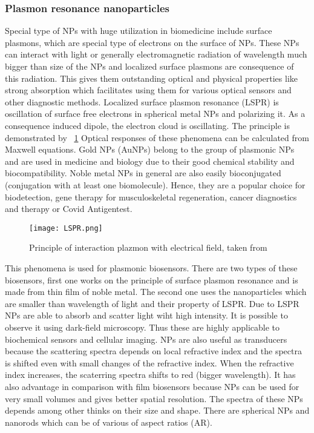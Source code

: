 \subsubsection{Plasmon resonance nanoparticles}

        Special type of NPs with huge utilization in biomedicine include surface plasmons, which are special type of electrons on the surface of NPs.
        These NPs can interact with light or generally electromagnetic radiation of wavelength much bigger than size of the NPs and localized surface
        plasmons are consequence of this radiation. This gives them outstanding optical and physical properties like strong absorption which facilitates
        using them for various optical sensors and other diagnostic methods. Localized surface plasmon resonance (LSPR) is oscillation of surface free
        electrons in spherical metal NPs and polarizing it. As a consequence induced dipole, the electron cloud is oscillating. The principle is demonstrated
        by ~\ref{fig:LSPR} Optical responses of these phenomena can be calculated from Maxwell equations. Gold NPs (AuNPs) belong to the group of plasmonic NPs
        and are used in medicine and biology due to their good chemical stability and biocompatibility. Noble metal NPs in general are also easily bioconjugated
        (conjugation with at least one biomolecule). Hence, they are a popular choice for biodetection, gene therapy for musculoskeletal regeneration,
        cancer diagnostics and therapy or Covid Antigentest. \cite{38, 39, 40, 41}

        \begin{figure}
            \texttt{[image: LSPR.png]}
            \caption{Principle of interaction plazmon with electrical field, taken from \cite{20}}
            \label{fig:LSPR}
        \end{figure}

        This phenomena is used for plasmonic biosensors. There are two types of these biosensors, first one works on the principle of surface plasmon resonance and
        is made from thin film of noble metal. The second one uses the nanoparticles which are smaller than wavelength of light and their property of LSPR.
        Due to LSPR NPs are able to absorb and scatter light wiht high intensity. It is possible to observe it using dark-field microscopy. Thus these are highly
        applicable to biochemical sensors and cellular imaging. NPs are also useful as transducers because the scattering spectra depends on local refractive index
        and the spectra is shifted even with small changes of the refractive index. When the refractive index increases, the scaterring spectra shifts to red (bigger wavelength).
        It has also advantage in comparison with film biosensors because NPs can be used for very small volumes and gives better spatial resolution.
        The spectra of these NPs depends among other thinks on their size and shape. There are spherical NPs and nanorods which can be of various of aspect ratios (AR). \cite{1, 4, 33, 34}

